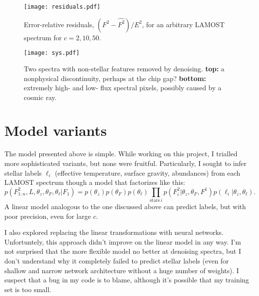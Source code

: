 \documentclass[12pt]{article}
\begin{document}
\begin{figure}
    \centering
    \texttt{[image: residuals.pdf]}
    \caption{Error-relative residuals, $(F^2 - \widehat{F^2})/E^2$, for an arbitrary LAMOST spectrum for $c=2, 10, 50$.}
    \label{residuals}
\end{figure} 

\begin{figure}
\centering
\texttt{[image: sys.pdf]}
\caption{Two spectra with non-stellar features removed by denoising. \textbf{top: } a nonphysical discontinuity, perhaps at the chip gap? \textbf{bottom: } extremely high- and low- flux spectral pixels, possibly caused by a cosmic ray.}
\label{sys}
\end{figure}

\section{Model variants} \label{var}
The model presented above is simple.
While working on this project, I trialled more sophisticated variants, but none were fruitful.
Particularly, I sought to infer stellar labels $\ell_i$ (effective temperature, surface gravity, abundances) from each LAMOST spectrum though a model that factorizes like this:
\begin{equation}
    p(F^2_{1:n}, L, \theta_z, \theta_F, \theta_\ell| F_1) = p(\theta_z) p(\theta_F) p(\theta_\ell) \prod_{\mathrm{stars}~i}  p(F^2_i | \theta_z, \theta_F, F^1) p(\ell_i | \theta_z, \theta_\ell) .
\end{equation}
A linear model analogous to the one discussed above can predict labels, but with poor precision, even for large $c$.

I also explored replacing the linear transformations with neural networks.
Unfortuntely, this approach didn't improve on the linear model in any way.
I'm not surprised that the more flexible model no better at denoising spectra, but I don't understand why it completely failed to predict stellar labels (even for shallow and narrow network architecture without a huge number of weights).
I suspect that a bug in my code is to blame, although it's possible that my training set is too small.

\end{document}
